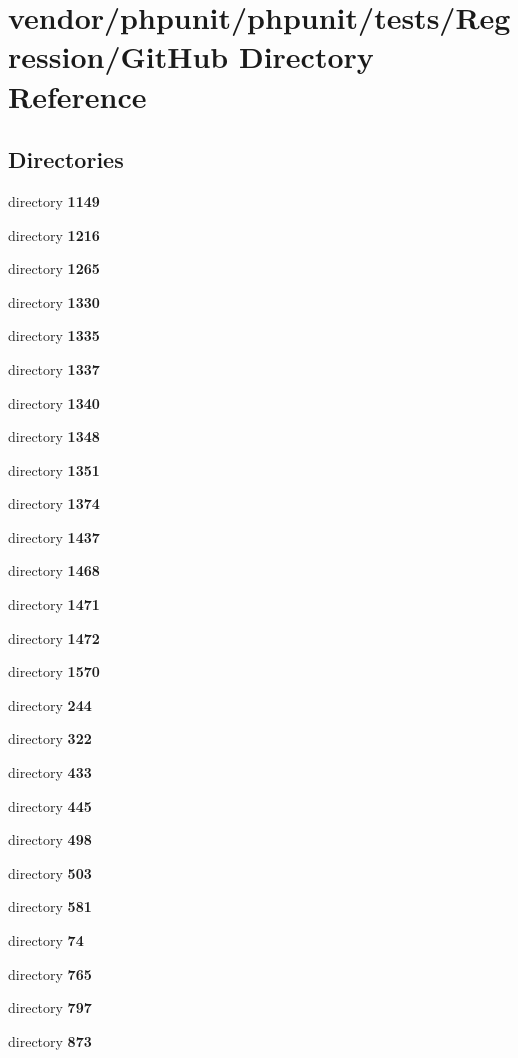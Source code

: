 \section{vendor/phpunit/phpunit/tests/\+Regression/\+Git\+Hub Directory Reference}
\label{dir_61339b95b8f4fd2732f92ae561e8442a}
\subsection*{Directories}
\begin{DoxyCompactItemize}
\item 
directory {\bf 1149}
\item 
directory {\bf 1216}
\item 
directory {\bf 1265}
\item 
directory {\bf 1330}
\item 
directory {\bf 1335}
\item 
directory {\bf 1337}
\item 
directory {\bf 1340}
\item 
directory {\bf 1348}
\item 
directory {\bf 1351}
\item 
directory {\bf 1374}
\item 
directory {\bf 1437}
\item 
directory {\bf 1468}
\item 
directory {\bf 1471}
\item 
directory {\bf 1472}
\item 
directory {\bf 1570}
\item 
directory {\bf 244}
\item 
directory {\bf 322}
\item 
directory {\bf 433}
\item 
directory {\bf 445}
\item 
directory {\bf 498}
\item 
directory {\bf 503}
\item 
directory {\bf 581}
\item 
directory {\bf 74}
\item 
directory {\bf 765}
\item 
directory {\bf 797}
\item 
directory {\bf 873}
\end{DoxyCompactItemize}

